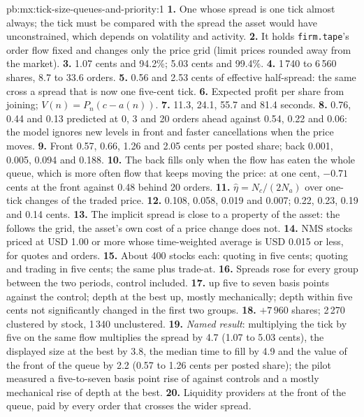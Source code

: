 \begin{solution}{pb:mx:tick-size-queues-and-priority:1}
\textbf{1.} One whose spread is one tick almost always; the tick must be compared with the spread the asset would have unconstrained, which depends on
volatility and activity.
\textbf{2.} It holds \texttt{firm.tape}'s order flow fixed and changes only the price grid (limit prices rounded away from the market).
\textbf{3.} 1.07 cents and 94.2\%; 5.03 cents and 99.4\%.
\textbf{4.} 1\,740 to 6\,560 shares, 8.7 to 33.6 orders.
\textbf{5.} 0.56 and 2.53 cents of effective half-spread: the same  cross a spread that is now one five-cent tick.
\textbf{6.} Expected profit per share from joining; $V(n)=P_n(c-a(n))$.
\textbf{7.} 11.3, 24.1, 55.7 and 81.4 seconds.
\textbf{8.} 0.76, 0.44 and 0.13 predicted at 0, 3 and 20 orders ahead against 0.54, 0.22 and 0.06: the model ignores new levels in front and faster
cancellations when the price moves.
\textbf{9.} Front 0.57, 0.66, 1.26 and 2.05 cents per posted share; back 0.001, 0.005, 0.094 and 0.188.
\textbf{10.} The back fills only when the flow has eaten the whole queue, which is more often flow that keeps moving the price: at one cent, $-0.71$ cents
at the front against 0.48 behind 20 orders.
\textbf{11.} $\hat\eta=N_c/(2N_a)$ over one-tick changes of the traded price.
\textbf{12.} 0.108, 0.058, 0.019 and 0.007; 0.22, 0.23, 0.19 and 0.14 cents.
\textbf{13.} The implicit spread is close to a property of the asset: the  follows the grid, the asset's own cost of a price change does not.
\textbf{14.} NMS stocks priced at USD 1.00 or more whose time-weighted average  is USD 0.015 or less, for quotes and orders.
\textbf{15.} About 400 stocks each: quoting in five cents; quoting and trading in five cents; the same plus trade-at.
\textbf{16.} Spreads rose for every group between the two periods, control included.
\textbf{17.}  up five to seven basis points against the control; depth at the best up, mostly mechanically; depth within five cents not
significantly changed in the first two groups.
\textbf{18.} $+7\,960$ shares; 2\,270 clustered by stock, 1\,340 unclustered.
\textbf{19.} \emph{Named result}: multiplying the tick by five on the same flow multiplies the spread by 4.7 (1.07 to 5.03 cents), the displayed size at the
best by 3.8, the median time to fill by 4.9 and the value of the front of the queue by 2.2 (0.57 to 1.26 cents per posted share); the pilot measured a
five-to-seven basis point rise of  against controls and a mostly mechanical rise of depth at the best.
\textbf{20.} Liquidity providers at the front of the queue, paid by every order that crosses the wider spread.
\end{solution}

